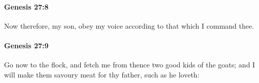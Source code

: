 		\paragraph{Genesis 27:8} %
			\label{GENESIS-27-8}

			Now therefore, my son, obey my voice according to that which I command thee.


		\paragraph{Genesis 27:9} %
			\label{GENESIS-27-9}

			Go now to the flock, and fetch me from thence two good kids of the goats; and I will make them savoury meat for thy father, such as he loveth:


